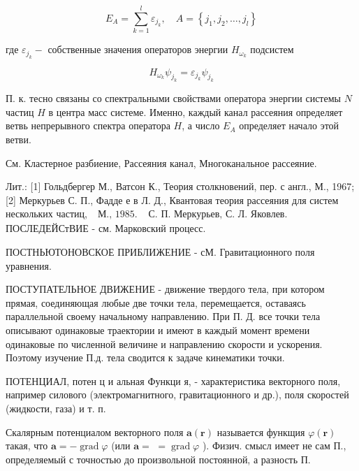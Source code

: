 \documentclass[10pt]{article}
\begin{document}
\[

E_{A}=\sum_{k=1}^{l} \varepsilon_{j_{k}}, \quad A=\left\{j_{1}, j_{2}, \ldots, j_{l}\right\}

\]



где $\varepsilon_{j_{k}}-$ собственные значения операторов энергии $H_{\omega_{k}}$ подсистем



\[

H_{\omega_{k}} \psi_{j_{k}}=\varepsilon_{j_{k}} \psi_{j_{k}}

\]



П. к. тесно связаны со спектральными свойствами оператора энергии системы $N$ частиц $H$ в центра масс системе. Именно, каждый канал рассеяния определяет ветвь непрерывного спектра оператора $H$, а число $E_{A}$ определяет начало этой ветви.



См. Кластерное разбиение, Рассеяния канал, Многоканальное рассеяние.



Лит.: [1] Гольдбергер М., Ватсон К., Теория столкновений, пер. с англ., М., 1967; [2] Меркурьев С. П., Фадде е в Л. Д., Квантовая теория рассеяния для систем нескольких частиц, $\begin{array}{ll}\text { М., } 1985 . & \text { С. П. Меркурьев, С. Л. Яковлев. }\end{array}$ ПОСЛЕДЕЙСтВИЕ - см. Марковский процесс.



ПОСТНЬЮТОНОВСКОЕ ПРИБЛИЖЕНИЕ - сМ. Гравитационного поля уравнения.



ПОСТУПАТЕЛЬНОЕ ДВИЖЕНИЕ - движение твердого тела, при котором прямая, соединяющая любые две точки тела, перемещается, оставаясь параллельной своему начальному направлению. При П. Д. все точки тела описывают одинаковые траектории и имеют в каждый момент времени одинаковые по численной величине и направлению скорости и ускорения. Поэтому изучение П.д. тела сводится к задаче кинематики точки.



ПОТЕНЦИАЛ, потен ц и альная Функци я, - характеристика векторного поля, например силового (электромагнитного, гравитационного и др.), поля скоростей (жидкости, газа) и т. п.



Скалярным потенциалом векторного поля $\boldsymbol{a}(\boldsymbol{r})$ называется функщия $\varphi(\boldsymbol{r})$ такая, что $\boldsymbol{a}=-\operatorname{grad} \varphi$ (или $\boldsymbol{a}=$ $=\operatorname{grad} \varphi$ ). Физич. смысл имеет не сам П., определяемый с точностью до произвольной постоянной, а разность П.
\end{document}
